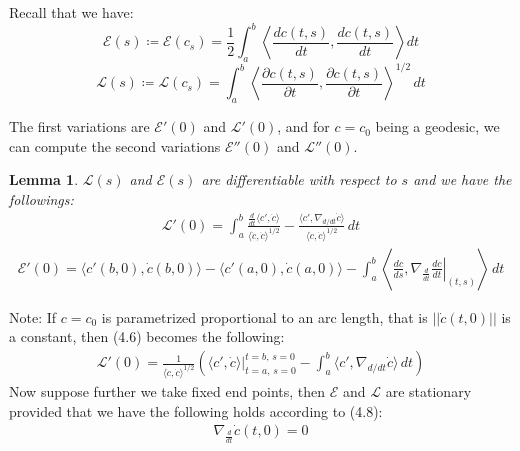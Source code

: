 \documentclass[11pt]{book}
\theoremstyle{break}
\theoremstyle{break}
\newtheorem{lem}{Lemma}[thm]
\newcommand{\pd}{\partial}
\newcommand{\note}{\color{red}Note: \color{black}}
\begin{document}
Recall that we have:
$$\mathcal{E}(s)\coloneqq \mathcal{E}(c_s) = \frac{1}{2}\int_a^b \left\langle \frac{dc(t,s)}{dt}, \frac{dc(t,s)}{dt} \right\rangle dt $$
$$\mathcal{L}(s)\coloneqq \mathcal{L}(c_s) = \int_a^b \left\langle \frac{\pd c(t,s)}{\pd t}, \frac{\pd c(t,s)}{\pd t}\right\rangle^{1/2}\, dt$$

The first variations are $\mathcal{E}'(0)$ and $\mathcal{L}'(0)$, and for $c = c_0$ being a geodesic, we can compute the second variations $\mathcal{E}''(0)$ and $\mathcal{L}''(0)$. \\

\begin{lem}
$\mathcal{L}(s)$ and $\mathcal{E}(s)$ are differentiable with respect to $s$ and we have the followings:
\begin{align}
\mathcal{L}'(0)= \int_{a}^b \frac{\frac{d}{dt}\langle c', \dot{c} \rangle}{ \langle \dot{c}, \dot{c}\rangle^{1/2}} - \frac{\langle c', \nabla_{d/dt}\dot{c}\rangle}{\langle \dot{c}, \dot{c}\rangle^{1/2}}\, dt
\end{align}
\begin{align}
\mathcal{E}'(0) = \langle c'(b,0), \dot{c}(b,0)\rangle -\langle c'(a,0) , \dot{c}(a,0) \rangle - \int_a^b \left\langle \frac{dc}{ds}, \left.\nabla_{\frac{d}{dt}}\frac{dc}{dt}\right|_{(t,s)}\right\rangle \, dt
\end{align}
\end{lem}
\note If $c = c_0$ is parametrized proportional to an arc length, that is $||\dot{c}(t,0)||$ is a constant, then (4.6) becomes the following:
\begin{align}
\mathcal{L}'(0) = \frac{1}{\langle \dot{c},\dot{ c}\rangle^{1/2}} \left( \langle c',\dot{c}\rangle |^{t=b,\, s=0}_{t=a,\, s = 0}- \int_a^b \langle c', \nabla_{d/dt}\dot{c}\rangle \,dt\right)
\end{align}
Now suppose further we take fixed end points, then $\mathcal{E}$ and $\mathcal{L}$ are stationary provided that we have the following holds according to (4.8):
\begin{align*}
\nabla_{\frac{d}{dt}}\dot{c}(t,0) = 0
\end{align*}
\end{document}

